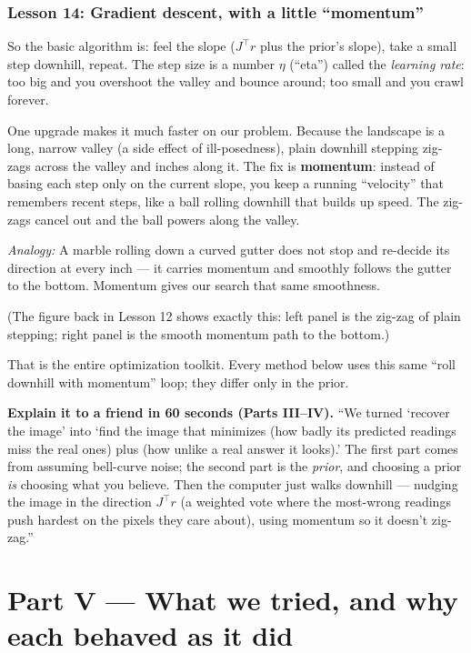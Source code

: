 \documentclass[11pt]{article}
\newcommand{\analogy}[1]{\par\smallskip\noindent\textit{Analogy:} #1\par\smallskip}
\begin{document}
\section{Lesson 14: Gradient descent, with a little ``momentum''}

So the basic algorithm is: feel the slope ($J^\top r$ plus the prior's slope),
take a small step downhill, repeat. The step size is a number $\eta$ (``eta'')
called the \emph{learning rate}: too big and you overshoot the valley and
bounce around; too small and you crawl forever.

One upgrade makes it much faster on our problem. Because the landscape is a
long, narrow valley (a side effect of ill-posedness), plain downhill stepping
zig-zags across the valley and inches along it. The fix is \textbf{momentum}:
instead of basing each step only on the current slope, you keep a running
``velocity'' that remembers recent steps, like a ball rolling downhill that
builds up speed. The zig-zags cancel out and the ball powers along the valley.

\analogy{A marble rolling down a curved gutter does not stop and re-decide its
direction at every inch --- it carries momentum and smoothly follows the
gutter to the bottom. Momentum gives our search that same smoothness.}

(The figure back in Lesson 12 shows exactly this: left panel is the zig-zag of
plain stepping; right panel is the smooth momentum path to the bottom.)

That is the entire optimization toolkit. Every method below uses this same
``roll downhill with momentum'' loop; they differ only in the prior.

\begin{intuition}
\textbf{Explain it to a friend in 60 seconds (Parts III--IV).} ``We turned
`recover the image' into `find the image that minimizes (how badly its
predicted readings miss the real ones) plus (how unlike a real answer it
looks).' The first part comes from assuming bell-curve noise; the second part
is the \emph{prior}, and choosing a prior \emph{is} choosing what you believe.
Then the computer just walks downhill --- nudging the image in the direction
$J^\top r$ (a weighted vote where the most-wrong readings push hardest on the
pixels they care about), using momentum so it doesn't zig-zag.''
\end{intuition}

\part*{Part V --- What we tried, and why each behaved as it did}
\end{document}

